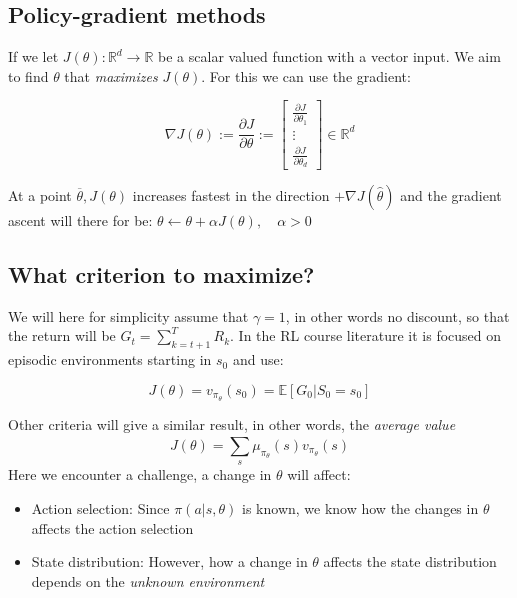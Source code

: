 \subsection{Policy-gradient methods}
If we let $J(\theta): \mathbb{R}^{d} \rightarrow \mathbb{R}$ be a scalar valued function with a vector input. We aim to find $\theta$ that \emph{maximizes} $J(\theta)$. For this we can use the gradient:

	\begin{equation}
	 	\nabla J(\theta) := \frac{\partial J} {\partial \theta} := \begin{bmatrix} \frac{\partial J} {\partial \theta_1} \\ \vdots \\ \frac{\partial J} {\partial \theta_d}   \end{bmatrix} \in \mathbb{R}^{d}
	 \end{equation}

At a point $\overline{\theta}, J(\theta)$ increases fastest in the direction $+\nabla J(\hat{\theta})$  and the gradient ascent will there for be: $\theta \leftarrow \theta + \alpha J(\theta), \quad \alpha > 0$

\subsection{What criterion to maximize?}
We will here for simplicity assume that $\gamma = 1$, in other words no discount, so that the return will be $G_t = \sum_{k= t+1}^{T} R_k$. In the RL course literature it is focused on episodic environments starting in $s_0$ and use:

	\begin{equation}
		J(\theta) = v_{\pi_\theta} (s_0) = \mathbb{E}[G_0 |S_0 = s_0]
	\end{equation}

Other criteria will give a similar result, in other words, the \emph{average value}
	\begin{equation}
		J(\theta) = \sum_{s}^{}\mu_{\pi_\theta}(s)v_{\pi_\theta}(s)
	\end{equation}
Here we encounter a challenge, a change in $\theta$ will affect:

\begin{itemize}
	\item Action selection: Since $\pi (a|s,\theta)$ is known, we know how the changes in $\theta$ affects the action selection
	\item State distribution: However, how a change in $\theta$ affects the state distribution depends on the \emph{unknown environment}
\end{itemize}

